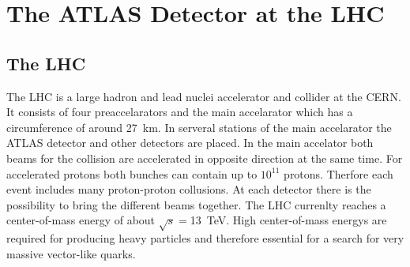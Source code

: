 \chapter{The ATLAS Detector at the LHC}

\section{The LHC}
The LHC \cite{LHC} is a large hadron and lead nuclei accelerator and collider at the CERN.
It consists of four preaccelarators and the main accelarator which has a circumference of around \SI{27}{km}. 
In serveral stations of the main accelarator the ATLAS detector and other detectors are placed. 
In the main accelator both beams for the collision are accelerated in opposite direction at the same time.
For accelerated protons both bunches can contain up to $10^{11}$ protons.
Therfore each event includes many proton-proton collusions.
At each detector there is the possibility to bring the different beams together. 
The LHC currenlty reaches a center-of-mass energy of about $\sqrt{s} =$\SI{13}{TeV}. 
High center-of-mass energys are required for producing heavy particles and therefore essential for a search for very massive vector-like quarks.


